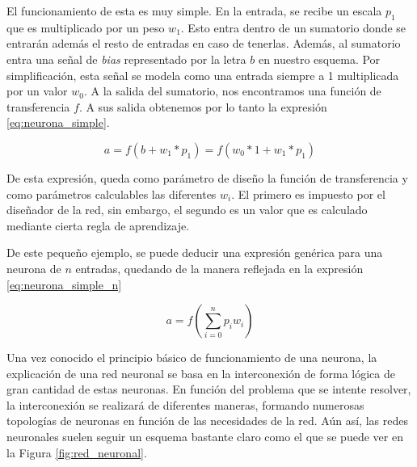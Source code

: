El funcionamiento de esta es muy simple. En la entrada, se recibe un escala $p_1$ que es multiplicado por un peso $w_1$. Esto entra dentro de un sumatorio donde se entrarán además el resto de entradas en caso de tenerlas. Además, al sumatorio entra una señal de \textit{bias} representado por la letra $b$ en nuestro esquema. Por simplificación, esta señal se modela como una entrada siempre a 1 multiplicada por un valor $w_0$. A la salida del sumatorio, nos encontramos una función de transferencia $f$. A sus salida obtenemos por lo tanto la expresión \ref{eq:neurona_simple}.

\begin{equation}
    a = f(b + w_1 * p_1) = f(w_0 * 1 + w_1 * p_1)
    \label{eq:neurona_simple}
\end{equation}

De esta expresión, queda como parámetro de diseño la función de transferencia y como parámetros calculables las diferentes $w_i$. El primero es impuesto por el diseñador de la red, sin embargo, el segundo es un valor que es calculado mediante cierta regla de aprendizaje.

De este pequeño ejemplo, se puede deducir una expresión genérica para una neurona de $n$ entradas, quedando de la manera reflejada en la expresión \ref{eq:neurona_simple_n}

\begin{equation}
    a = f(\sum^{n}_{i=0} p_i w_i)
    \label{eq:neurona_simple_n}
\end{equation}

Una vez conocido el principio básico de funcionamiento de una neurona, la explicación de una red neuronal se basa en la interconexión de forma lógica de gran cantidad de estas neuronas. En función del problema que se intente resolver, la interconexión se realizará de diferentes maneras, formando numerosas topologías de neuronas en función de las necesidades de la red. Aún así, las redes neuronales suelen seguir un esquema bastante claro como el que se puede ver en la Figura \ref{fig:red_neuronal}.

